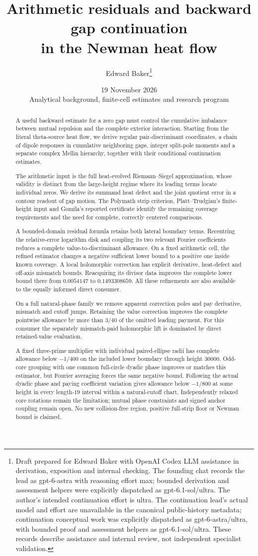 \documentclass[11pt]{article}
\title{Arithmetic residuals and backward gap continuation\\in the Newman heat flow}
\author{Edward Baker\thanks{Draft prepared for Edward Baker with OpenAI Codex LLM assistance in derivation, exposition and internal checking. The founding chat records the lead as gpt-6-astra with reasoning effort max; bounded derivation and assessment helpers were explicitly dispatched as gpt-6.1-sol/ultra. The author's intended continuation effort is ultra. The continuation lead's actual model and effort are unavailable in the canonical public-history metadata; continuation conceptual work was explicitly dispatched as gpt-6-astra/ultra, with bounded proof and assessment helpers as gpt-6.1-sol/ultra. These records describe assistance and internal review, not independent specialist validation.}}
\date{19 November 2026\\\small Analytical background, finite-cell estimates and research program}
\numberwithin{equation}{section}
\theoremstyle{definition}
\theoremstyle{remark}
\begin{document}
\maketitle
\begin{abstract}
A useful backward estimate for a zero gap must control the cumulative
imbalance between mutual repulsion and the complete exterior interaction.
Starting from the literal theta-source heat flow, we derive regular
pair-discriminant coordinates, a chain of dipole responses in cumulative
neighboring gaps, integer split-pole moments and a separate complex
Mellin hierarchy, together with their conditional continuation estimates.

The arithmetic input is the full heat-evolved Riemann--Siegel
approximation, whose validity is distinct from the large-height regime
where its leading terms locate individual zeros. We derive its summand
heat defect and the joint quotient error in a contour readout of gap
motion. The Polymath strip criterion, Platt--Trudgian's finite-height
input and Gomila's reported certificate identify the remaining coverage
requirements and the need for complete, correctly centered comparisons.

A bounded-domain residual formula retains both lateral boundary terms.
Recentring the relative-error logarithm disk and coupling its two relevant
Fourier coefficients reduces a complete value-to-discriminant allowance.
On a fixed arithmetic cell, the refined estimator changes a negative
sufficient lower bound to a positive one inside known coverage.
A local holomorphic correction has explicit derivative, heat-defect
and off-axis mismatch bounds. Reacquiring its divisor data improves
the complete lower bound there from $0.0054147$ to $0.1493308659$.
All these refinements are also available to the equally informed direct
consumer.

On a full natural-phase family we remove apparent correction poles and
pay derivative, mismatch and cutoff jumps. Retaining the value correction
improves the complete pointwise allowance by more than $3/40$ of the
omitted leading payment. For this consumer the separately mismatch-paid
holomorphic lift is dominated by direct retained-value evaluation.

A fixed three-prime multiplier with individual paired-ellipse radii has
complete allowance below $-1/400$ on the included lower boundary through
height $30000$. Odd-core grouping with one common full-circle dyadic
phase improves or matches this estimator, but Fourier averaging forces
the same negative bound. Following the actual dyadic phase and paying
coefficient variation gives allowance below $-1/800$ at some height in
every length-$19$ interval within a natural-cutoff chart. Independently
relaxed core rotations remain the limitation; mutual phase constraints
and signed anchor coupling remain open. No new collision-free region,
positive full-strip floor or Newman bound is claimed.
\end{abstract}
\end{document}
